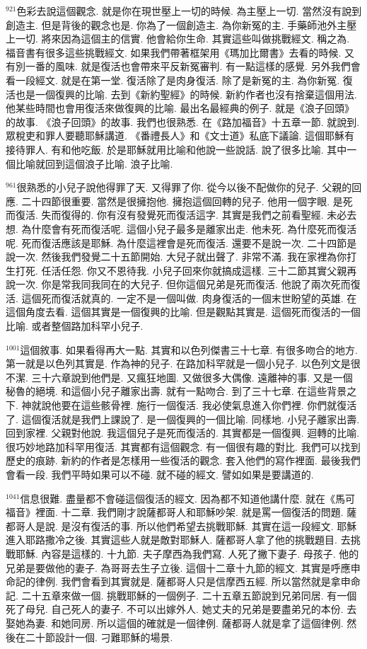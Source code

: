 \documentclass{book}
\begin{document}
$^{921}$色彩去說這個觀念.
就是你在現世壓上一切的時候.
為主壓上一切.
當然沒有說到創造主.
但是背後的觀念也是.
你為了一個創造主.
為你新冤的主.
手藥師池外主壓上一切.
將來因為這個主的信實.
他會給你生命.
其實這些叫做挑戰經文.
稱之為.
福音書有很多這些挑戰經文.
如果我們帶著框架用《瑪加比爾書》去看的時候.
又有別一番的風味.
就是復活也會帶來平反新冤審判.
有一點這樣的感覺.
另外我們會看一段經文.
就是在第一堂.
復活除了是肉身復活.
除了是新冤的主.
為你新冤.
復活也是一個復興的比喻.
去到《新約聖經》的時候.
新約作者也沒有捨棄這個用法.
他某些時間也會用復活來做復興的比喻.
最出名最經典的例子.
就是《浪子回頭》的故事.
《浪子回頭》的故事.
我們也很熟悉.
在《路加福音》十五章一節.
就說到.
眾稅吏和罪人要聽耶穌講道.
《番禮長人》和《文士道》私底下議論.
這個耶穌有接待罪人.
有和他吃飯.
於是耶穌就用比喻和他說一些說話.
說了很多比喻.
其中一個比喻就回到這個浪子比喻.
浪子比喻.

$^{961}$很熟悉的小兒子說他得罪了天.
又得罪了你.
從今以後不配做你的兒子.
父親的回應.
二十四節很重要.
當然是很擁抱他.
擁抱這個回轉的兒子.
他用一個字眼.
是死而復活.
失而復得的.
你有沒有發覺死而復活這字.
其實是我們之前看聖經.
未必去想.
為什麼會有死而復活呢.
這個小兒子最多是離家出走.
他未死.
為什麼死而復活呢.
死而復活應該是耶穌.
為什麼這裡會是死而復活.
還要不是說一次.
二十四節是說一次.
然後我們發覺二十五節開始.
大兒子就出聲了.
非常不滿.
我在家裡為你打生打死.
任活任怨.
你又不恩待我.
小兒子回來你就搞成這樣.
三十二節其實父親再說一次.
你是常我同我同在的大兒子.
但你這個兄弟是死而復活.
他說了兩次死而復活.
這個死而復活就真的.
一定不是一個叫做.
肉身復活的一個末世盼望的英雄.
在這個角度去看.
這個其實是一個復興的比喻.
但是觀點其實是.
這個死而復活的一個比喻.
或者整個路加科罕小兒子.

$^{1001}$這個敘事.
如果看得再大一點.
其實和以色列傑書三十七章.
有很多吻合的地方.
第一就是以色列其實是.
作為神的兒子.
在路加科罕就是一個小兒子.
以色列文是很不潔.
三十六章說到他們是.
又瘋狂地圖.
又做很多大偶像.
遠離神的事.
又是一個秘魯的絕境.
和這個小兒子離家出壽.
就有一點吻合.
到了三十七章.
在這些背景之下.
神就說他要在這些骸骨裡.
施行一個復活.
我必使氣息進入你們裡.
你們就復活了.
這個復活就是我們上課說了.
是一個復興的一個比喻.
同樣地.
小兒子離家出壽.
回到家裡.
父親對他說.
我這個兒子是死而復活的.
其實都是一個復興.
迴轉的比喻.
很巧妙地路加科罕用復活.
其實都有這個觀念.
有一個很有趣的對比.
我們可以找到歷史的痕跡.
新約的作者是怎樣用一些復活的觀念.
套入他們的寫作裡面.
最後我們會看一段.
我們平時如果可以不碰.
就不碰的經文.
譬如如果是要講道的.

$^{1041}$信息很難.
盡量都不會碰這個復活的經文.
因為都不知道他講什麼.
就在《馬可福音》裡面.
十二章.
我們剛才說薩都哥人和耶穌吵架.
就是罵一個復活的問題.
薩都哥人是說.
是沒有復活的事.
所以他們希望去挑戰耶穌.
其實在這一段經文.
耶穌進入耶路撒冷之後.
其實這些人就是敵對耶穌人.
薩都哥人拿了他的挑戰題目.
去挑戰耶穌.
內容是這樣的.
十九節.
夫子摩西為我們寫.
人死了撇下妻子.
母孩子.
他的兄弟是要做他的妻子.
為哥哥去生子立後.
這個十二章十九節的經文.
其實是呼應申命記的律例.
我們會看到其實就是.
薩都哥人只是信摩西五經.
所以當然就是拿申命記.
二十五章來做一個.
挑戰耶穌的一個例子.
二十五章五節說到兄弟同居.
有一個死了母兒.
自己死人的妻子.
不可以出嫁外人.
她丈夫的兄弟是要盡弟兄的本份.
去娶她為妻.
和她同房.
所以這個的確就是一個律例.
薩都哥人就是拿了這個律例.
然後在二十節設計一個.
刁難耶穌的場景.
\end{document}
